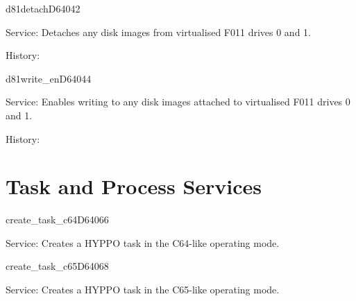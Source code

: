 \newpage
\begin{hyppotrap}{d81detach}{D640}{42}
\item [Service:]
  Detaches any disk images from virtualised F011 drives 0 and 1.
\item [History:]
\end{hyppotrap}


%
\newpage
\begin{hyppotrap}{d81write\_en}{D640}{44}
\item [Service:]
  Enables writing to any disk images attached to virtualised F011 drives 0
  and 1.
\item [History:]
\end{hyppotrap}



\newpage
\section{Task and Process Services}


\begin{hyppotrap}{create\_task\_c64}{D640}{66}
\item [Service:]
  Creates a HYPPO task in the C64-like operating mode.
\notimplemented
\end{hyppotrap}


\begin{hyppotrap}{create\_task\_c65}{D640}{68}
\item [Service:]
  Creates a HYPPO task in the C65-like operating mode.
\notimplemented
\end{hyppotrap}



